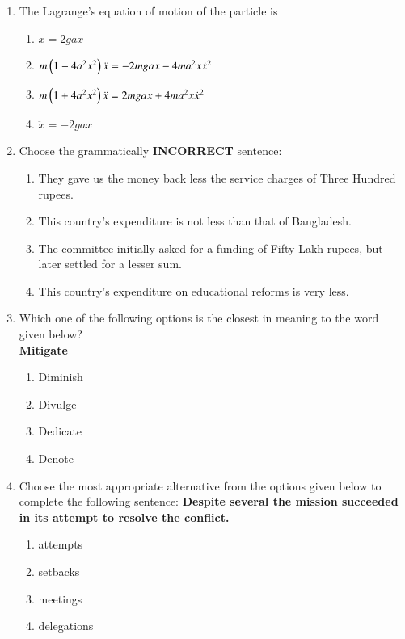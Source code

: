 \documentclass[journal]{IEEEtran}
\numberwithin{equation}{enumi}
\numberwithin{figure}{enumi}
\begin{document}
\begin{enumerate}[start=53]
\item The Lagrange's equation of motion of the particle is
    \begin{enumerate}
        \item $\ddot{x} = 2gax$
	\item $m\left(1 + 4a^2x^2\right)\ddot{x} = -2mgax - 4ma^2x\dot{x}^2$
	\item $m\left(1 + 4a^2x^2\right)\ddot{x} = 2mgax + 4ma^2x\dot{x}^2$
        \item $\ddot{x} = -2gax$
    \end{enumerate}

\item Choose the grammatically \textbf{INCORRECT} sentence:
    \begin{enumerate}
        \item They gave us the money back less the service charges of Three Hundred rupees.
        \item This country's expenditure is not less than that of Bangladesh.
        \item The committee initially asked for a funding of Fifty Lakh rupees, but later settled for a lesser sum.
        \item This country's expenditure on educational reforms is very less.
    \end{enumerate}

\item Which one of the following options is the closest in meaning to the word given below?\\
\textbf{Mitigate}
    \begin{enumerate}
        \item Diminish
        \item Divulge
        \item Dedicate
        \item Denote
    \end{enumerate}

\item Choose the most appropriate alternative from the options given below to complete the following sentence:  
\textbf{Despite several \underline{\hspace{1cm}} the mission succeeded in its attempt to resolve the conflict.}
    \begin{enumerate}
        \item attempts
        \item setbacks
        \item meetings
        \item delegations
    \end{enumerate}


\end{enumerate}
\end{document}
